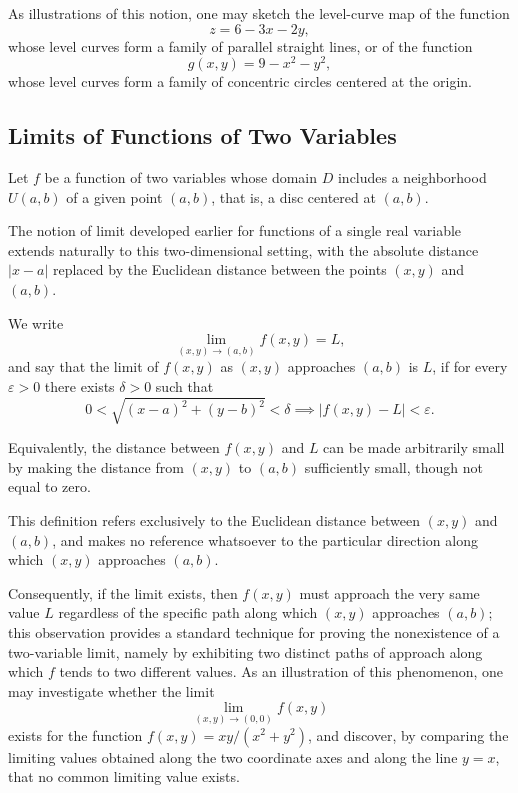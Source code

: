 As illustrations of this notion, one may sketch the level-curve map of the function
\[
z = 6 - 3x - 2y,
\]
whose level curves form a family of parallel straight lines, or of the function
\[
g(x,y) = 9 - x^2 - y^2,
\]
whose level curves form a family of concentric circles centered at the origin.

\subsection{Limits of Functions of Two Variables}

Let $f$ be a function of two variables whose domain $D$ includes a neighborhood $U(a,b)$ of a given point $(a,b)$, that is, a disc centered at $(a,b)$.

The notion of limit developed earlier for functions of a single real variable extends naturally to this two-dimensional setting, with the absolute distance $|x-a|$ replaced by the Euclidean distance between the points $(x,y)$ and $(a,b)$.

\begin{definition}
We write \[
\lim_{(x,y) \to (a,b)} f(x,y) = L,
\] and say that the limit of $f(x,y)$ as $(x,y)$ approaches $(a,b)$ is $L$, if for every $\varepsilon > 0$ there exists $\delta > 0$ such that
\[
0 < \sqrt{(x-a)^2 + (y-b)^2} < \delta \implies |f(x,y) - L| < \varepsilon.
\]

Equivalently, the distance between $f(x,y)$ and $L$ can be made arbitrarily small by making the distance from $(x,y)$ to $(a,b)$ sufficiently small, though not equal to zero.
\end{definition}

\begin{remark}
This definition refers exclusively to the Euclidean distance between $(x,y)$ and $(a,b)$, and makes no reference whatsoever to the particular direction along which $(x,y)$ approaches $(a,b)$.

Consequently, if the limit exists, then $f(x,y)$ must approach the very same value $L$ regardless of the specific path along which $(x,y)$ approaches $(a,b)$; this observation provides a standard technique for proving the nonexistence of a two-variable limit, namely by exhibiting two distinct paths of approach along which $f$ tends to two different values. As an illustration of this phenomenon, one may investigate whether the limit \[
\lim_{(x,y) \to (0,0)} f(x,y)
\] exists for the function $f(x,y) = xy/(x^2+y^2)$, and discover, by comparing the limiting values obtained along the two coordinate axes and along the line $y=x$, that no common limiting value exists.
\end{remark}

